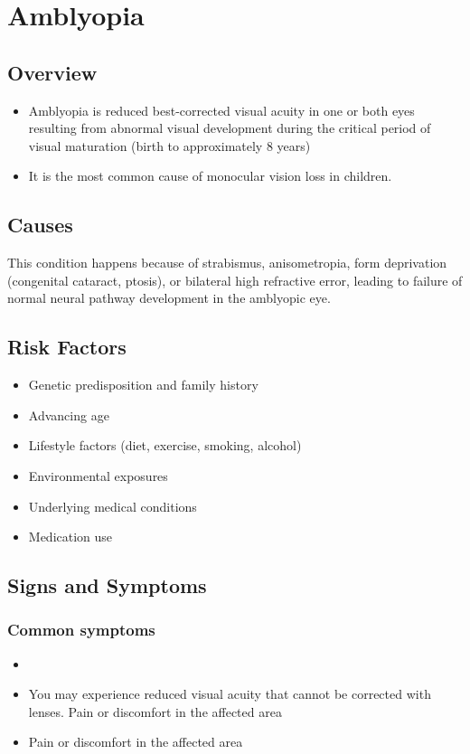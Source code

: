\chapter{Amblyopia}
\label{sec:Amblyopia}

\section{Overview}


\begin{itemize}[noitemsep]
  \item Amblyopia is reduced best-corrected visual acuity in one or both eyes resulting from abnormal visual development during the critical period of visual maturation (birth to approximately 8 years)
  \item It is the most common cause of monocular vision loss in children.
\end{itemize}
\section{Causes}
This condition happens because of strabismus, anisometropia, form deprivation (congenital cataract, ptosis), or bilateral high refractive error, leading to failure of normal neural pathway development in the amblyopic eye.     
\section{Risk Factors}

\begin{itemize}[noitemsep]
  \item Genetic predisposition and family history
  \item Advancing age
  \item Lifestyle factors (diet, exercise, smoking, alcohol)
  \item Environmental exposures
  \item Underlying medical conditions
  \item Medication use
\end{itemize}
\section{Signs and Symptoms}

\subsection{Common symptoms}
\begin{itemize}[noitemsep]
  \item \item You may experience reduced visual acuity that cannot be corrected with lenses. Pain or discomfort in the affected area    \item Pain or discomfort in the affected area
  \end{itemize}

